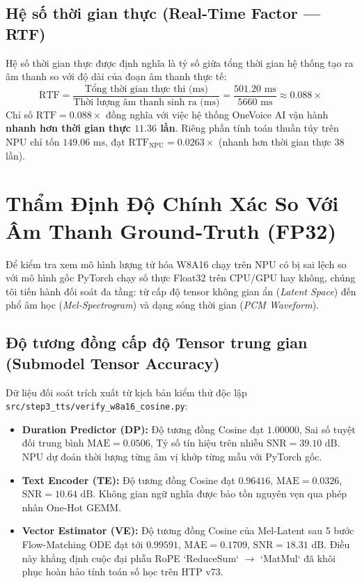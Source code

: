 \documentclass[11pt,a4paper,oneside,table]{report}
\begin{document}
\subsection{Hệ số thời gian thực (Real-Time Factor --- RTF)}
Hệ số thời gian thực được định nghĩa là tỷ số giữa tổng thời gian hệ thống tạo ra âm thanh so với độ dài của đoạn âm thanh thực tế:
\begin{equation}
    \text{RTF} = \frac{\text{Tổng thời gian thực thi (ms)}}{\text{Thời lượng âm thanh sinh ra (ms)}} = \frac{501.20\text{ ms}}{5660\text{ ms}} \approx \mathbf{0.088\times}
\end{equation}
Chỉ số $\text{RTF} = 0.088\times$ đồng nghĩa với việc hệ thống OneVoice AI vận hành \textbf{nhanh hơn thời gian thực $11.36$ lần}. Riêng phần tính toán thuần túy trên NPU chỉ tốn $149.06\text{ ms}$, đạt $\text{RTF}_{\text{NPU}} = 0.0263\times$ (nhanh hơn thời gian thực $38$ lần).

\section{Thẩm Định Độ Chính Xác So Với Âm Thanh Ground-Truth (FP32)}
Để kiểm tra xem mô hình lượng tử hóa W8A16 chạy trên NPU có bị sai lệch so với mô hình gốc PyTorch chạy số thực Float32 trên CPU/GPU hay không, chúng tôi tiến hành đối soát đa tầng: từ cấp độ tensor không gian ẩn (\textit{Latent Space}) đến phổ âm học (\textit{Mel-Spectrogram}) và dạng sóng thời gian (\textit{PCM Waveform}).

\subsection{Độ tương đồng cấp độ Tensor trung gian (Submodel Tensor Accuracy)}
Dữ liệu đối soát trích xuất từ kịch bản kiểm thử độc lập \texttt{src/step3\_tts/verify\_w8a16\_cosine.py}:
\begin{itemize}
    \item \textbf{Duration Predictor (DP):} Độ tương đồng Cosine đạt \textbf{$1.00000$}, Sai số tuyệt đối trung bình $\text{MAE} = 0.0506$, Tỷ số tín hiệu trên nhiễu $\text{SNR} = 39.10\text{ dB}$. NPU dự đoán thời lượng từng âm vị khớp từng mẫu với PyTorch gốc.
    \item \textbf{Text Encoder (TE):} Độ tương đồng Cosine đạt \textbf{$0.96416$}, $\text{MAE} = 0.0326$, $\text{SNR} = 10.64\text{ dB}$. Không gian ngữ nghĩa được bảo tồn nguyên vẹn qua phép nhân One-Hot GEMM.
    \item \textbf{Vector Estimator (VE):} Độ tương đồng Cosine của Mel-Latent sau 5 bước Flow-Matching ODE đạt tới \textbf{$0.99591$}, $\text{MAE} = 0.1709$, $\text{SNR} = 18.31\text{ dB}$. Điều này khẳng định cuộc đại phẫu RoPE `ReduceSum` $\to$ `MatMul` đã khôi phục hoàn hảo tính toán số học trên HTP v73.
\end{itemize}
\end{document}

